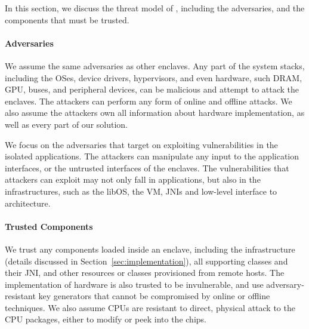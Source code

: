 \label{sec:threat}

In this section, we discuss the threat model of \sysname{},
including the adversaries,
and the components that must be trusted.

\paragraph{Adversaries}
We assume the same adversaries as other \sgx{} enclaves.
Any part of the system stacks, including the OSes,
device drivers, hypervisors, and even hardware,
such DRAM, GPU, buses, and peripheral devices, can be malicious
and attempt to attack the enclaves.
The attackers can perform any form of
online and offline attacks.
We also assume the attackers own all information
about \sgx{} hardware implementation, as well as every part of our solution.

We focus on the adversaries that target on
exploiting vulnerabilities in the isolated applications.
The attackers can manipulate any input to the application interfaces,
or the untrusted interfaces of the enclaves.
The vulnerabilities that attackers can exploit may not only fall in applications, but also in the infrastructures,
such as the libOS, the \java{} VM, JNIs and low-level interface to architecture.


\paragraph{Trusted Components}
We trust any components loaded inside an enclave,
including the infrastructure (details discussed in Section~\ref{sec:implementation}), %
all supporting classes and their JNI,
and other resources or classes provisioned from remote hosts.
The implementation of \sgx{} hardware is also trusted to be invulnerable,
and use adversary-resistant key generators that cannot be compromised
by online or offline techniques.
We also assume \intel{} CPUs are resistant to direct, physical attack to the CPU packages, either to modify or peek into the chips.

